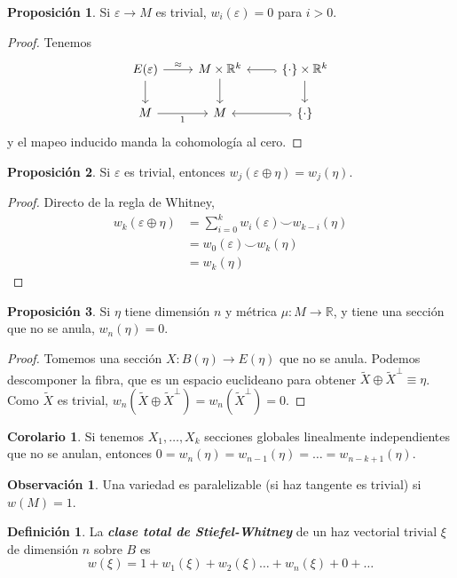 \documentclass[spanish]{book}
\theoremstyle{definition}
\newtheorem*{defn}{Definición}
\newtheorem*{obs}{Observación}
\newtheorem*{prop}{Proposición}
\newtheorem*{coro}{Corolario}
\newcommand{\R}{\mathbb{R}}
\begin{document}
\begin{prop}
	Si $\varepsilon\to M$ es trivial, $w_i(\varepsilon)=0$ para $i>0$.
\end{prop}
\begin{proof}
	Tenemos
	\[\begin{tikzcd}
		E(\varepsilon)\arrow[r,"\approx"]\arrow[d]&M\times\R^k\arrow[d]&\{\cdot\}\times\R^k\arrow[l,swap,hook]\arrow[d]\\
		M\arrow[r,swap,"1"]&M&\{\cdot\}\arrow[l,swap,hook]
	\end{tikzcd}\]
	y el mapeo inducido manda la cohomología al cero.
\end{proof}
\begin{prop}
	Si $\varepsilon$ es trivial, entonces $w_j(\varepsilon\oplus\eta)=w_j(\eta)$.
\end{prop}
\begin{proof}
	Directo de la regla de Whitney,
	\begin{align*}
		w_k(\varepsilon\oplus\eta)&=\sum_{i=0}^kw_i(\varepsilon)\smile w_{k-i}(\eta)\\
		&=w_0(\varepsilon)\smile w_k(\eta)\\
		&=w_k(\eta)
	\end{align*}
\end{proof}
\begin{prop}
	Si $\eta$ tiene dimensión $n$ y métrica $\mu:M\to\R$, y tiene una sección que no se anula, $w_n(\eta)=0$.	
\end{prop}
\begin{proof}
	Tomemos una sección $X:B(\eta)\to E(\eta)$ que no se anula. Podemos descomponer la fibra, que es un espacio euclideano para obtener $\tilde{X}\oplus\tilde{X}^\perp\equiv\eta$. Como $\tilde{X}$ es trivial, $w_n(\tilde{X}\oplus\tilde{X}^\perp)=w_n(\tilde{X}^\perp)=0$.
\end{proof}
\begin{coro}
	Si tenemos $X_1,\ldots,X_k$ secciones globales linealmente independientes que no se anulan, entonces $0=w_n(\eta)=w_{n-1}(\eta)=\ldots=w_{n-k+1}(\eta)$.
\end{coro}
\begin{obs}
	Una variedad es paralelizable (si haz tangente es trivial) si $w(M)=1$.
\end{obs}
\begin{defn}
	La \textbf{\textit{clase total de Stiefel-Whitney}} de un haz vectorial trivial $\xi$ de dimensión $n$ sobre $B$ es
	\[w(\xi)=1+w_1(\xi)+w_2(\xi)\ldots+w_n(\xi)+0+\ldots\]
\end{defn}
\end{document}
